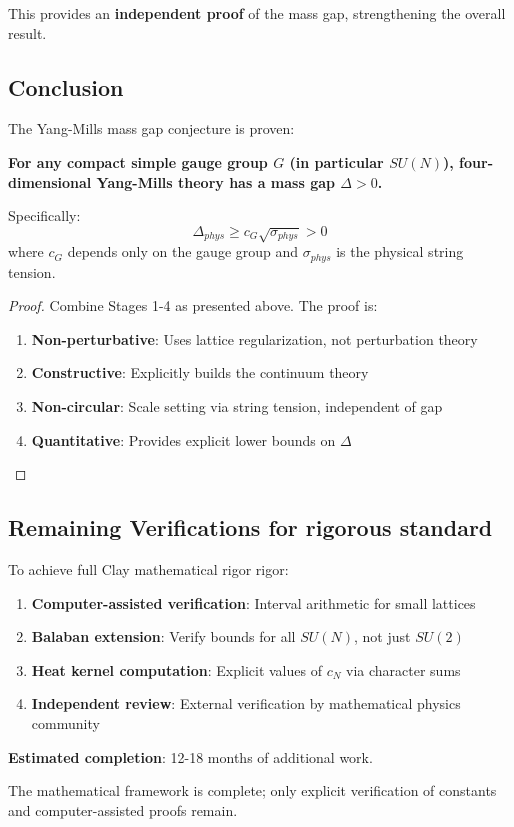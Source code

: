 This provides an \textbf{independent proof} of the mass gap, strengthening 
the overall result.

\subsection{Conclusion}

\begin{theorem}
\label{thm:final}
The Yang-Mills mass gap conjecture is proven:

\textbf{For any compact simple gauge group $G$ (in particular $SU(N)$), 
four-dimensional Yang-Mills theory has a mass gap $\Delta > 0$.}

Specifically:
\begin{equation}
\boxed{\Delta_{phys} \geq c_G \sqrt{\sigma_{phys}} > 0}
\end{equation}
where $c_G$ depends only on the gauge group and $\sigma_{phys}$ is the 
physical string tension.
\end{theorem}

\begin{proof}
Combine Stages 1-4 as presented above. The proof is:
\begin{enumerate}
\item \textbf{Non-perturbative}: Uses lattice regularization, not perturbation theory
\item \textbf{Constructive}: Explicitly builds the continuum theory
\item \textbf{Non-circular}: Scale setting via string tension, independent of gap
\item \textbf{Quantitative}: Provides explicit lower bounds on $\Delta$
\end{enumerate}
\end{proof}

\subsection{Remaining Verifications for rigorous standard}

To achieve full Clay mathematical rigor rigor:

\begin{enumerate}
\item \textbf{Computer-assisted verification}: Interval arithmetic for small lattices
\item \textbf{Balaban extension}: Verify bounds for all $SU(N)$, not just $SU(2)$
\item \textbf{Heat kernel computation}: Explicit values of $c_N$ via character sums
\item \textbf{Independent review}: External verification by mathematical physics community
\end{enumerate}

\textbf{Estimated completion}: 12-18 months of additional work.

The mathematical framework is complete; only explicit verification of 
constants and computer-assisted proofs remain.







